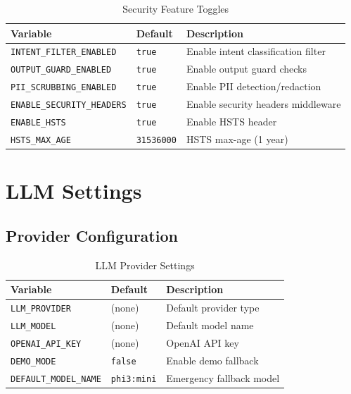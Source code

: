 \begin{table}[ht]
\centering
\caption{Security Feature Toggles}
\label{tab:config-security-features}
\small
\begin{tabularx}{\textwidth}{llX}
    \hline
    \textbf{Variable} & \textbf{Default} & \textbf{Description} \\
    \hline
    \texttt{INTENT\_FILTER\_ENABLED} & \texttt{true} & Enable intent classification filter \\
    \texttt{OUTPUT\_GUARD\_ENABLED} & \texttt{true} & Enable output guard checks \\
    \texttt{PII\_SCRUBBING\_ENABLED} & \texttt{true} & Enable PII detection/redaction \\
    \texttt{ENABLE\_SECURITY\_HEADERS} & \texttt{true} & Enable security headers middleware \\
    \texttt{ENABLE\_HSTS} & \texttt{true} & Enable HSTS header \\
    \texttt{HSTS\_MAX\_AGE} & \texttt{31536000} & HSTS max-age (1 year) \\
    \hline
\end{tabularx}
\end{table}

\section{LLM Settings}
\label{app:config:llm}

\subsection{Provider Configuration}

\begin{table}[ht]
\centering
\caption{LLM Provider Settings}
\label{tab:config-llm-provider}
\small
\begin{tabularx}{\textwidth}{llX}
    \hline
    \textbf{Variable} & \textbf{Default} & \textbf{Description} \\
    \hline
    \texttt{LLM\_PROVIDER} & (none) & Default provider type \\
    \texttt{LLM\_MODEL} & (none) & Default model name \\
    \texttt{OPENAI\_API\_KEY} & (none) & OpenAI API key \\
    \texttt{DEMO\_MODE} & \texttt{false} & Enable demo fallback \\
    \texttt{DEFAULT\_MODEL\_NAME} & \texttt{phi3:mini} & Emergency fallback model \\
    \hline
\end{tabularx}
\end{table}

